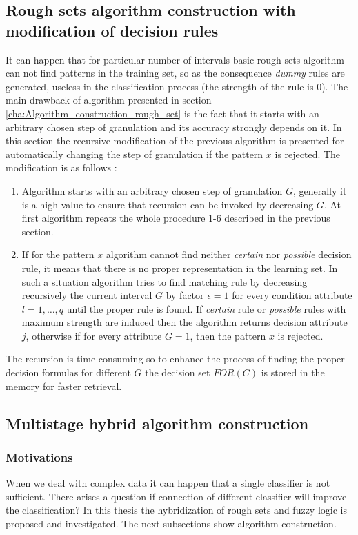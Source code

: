 \subsection{Rough sets algorithm construction with modification of decision rules}
\label{cha:Algorithm_construction_rough_set_modification}
It can happen that for particular number of intervals basic rough sets algorithm can not find patterns in
the training set, so as the consequence \textit{dummy} rules are generated, useless in the
classification process (the strength of the rule is 0). 
The main drawback of algorithm presented in section \ref{cha:Algorithm_construction_rough_set}
is the fact that it starts with an arbitrary chosen step of granulation and its accuracy strongly
depends on it. In this section the recursive modification of the previous algorithm is
presented for automatically changing the step of granulation if
the pattern $x$ is rejected. The modification is as follows \cite{bib36}:
\begin{enumerate}
    \item Algorithm starts with an arbitrary chosen step of granulation  $G$, 
        generally it is a high value to ensure that recursion can be invoked
        by decreasing $G$. At first algorithm repeats the whole procedure 1-6 described
        in the previous section.
    \item If for the pattern $x$ algorithm cannot find neither \textit{certain} nor \textit{possible}
        decision rule, it means that there is no proper representation in the learning set. 
        In such a situation algorithm tries to find matching rule by decreasing recursively
        the current interval $G$ by factor $\epsilon=1$ for every condition attribute $l=1, \ldots, q$
        until the proper rule is found. If \textit{certain} rule or
        \textit{possible} rules with maximum strength are induced then the algorithm
        returns decision attribute $j$, otherwise if for every attribute $G=1$, then the pattern $x$ is rejected.
\end{enumerate} 
The recursion is time consuming so to enhance the process of finding the proper
decision formulas for different $G$ the decision set $FOR(C)$ is stored in the memory
for faster retrieval.

\subsection{Multistage hybrid algorithm construction}
\label{cha:Multistage}
\subsubsection{Motivations}
\label{cha:Mutlistage_motivations}
When we deal with complex data it can happen that a single classifier is not
sufficient. There arises a question if connection of different classifier will
improve the classification? In this thesis the hybridization of rough sets and
fuzzy logic is proposed and investigated. The next subsections show algorithm construction.

